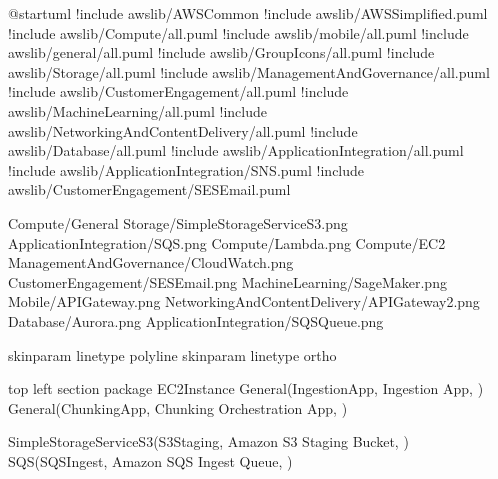\documentclass[letterpaper,10pt,english]{sphinxmanual}
\begin{document}
\begin{sphinxVerbatim}[commandchars=\\\{\},numbers=left,firstnumber=1,stepnumber=1]
@startuml
!include \PYGZlt{}awslib/AWSCommon\PYGZgt{}
!include \PYGZlt{}awslib/AWSSimplified.puml\PYGZgt{}
!include \PYGZlt{}awslib/Compute/all.puml\PYGZgt{}
!include \PYGZlt{}awslib/mobile/all.puml\PYGZgt{}
!include \PYGZlt{}awslib/general/all.puml\PYGZgt{}
!include \PYGZlt{}awslib/GroupIcons/all.puml\PYGZgt{}
!include \PYGZlt{}awslib/Storage/all.puml\PYGZgt{}
!include \PYGZlt{}awslib/ManagementAndGovernance/all.puml\PYGZgt{}
!include \PYGZlt{}awslib/CustomerEngagement/all.puml\PYGZgt{}
!include \PYGZlt{}awslib/MachineLearning/all.puml\PYGZgt{}
!include \PYGZlt{}awslib/NetworkingAndContentDelivery/all.puml\PYGZgt{}
!include \PYGZlt{}awslib/Database/all.puml\PYGZgt{}
!include \PYGZlt{}awslib/ApplicationIntegration/all.puml\PYGZgt{}
!include \PYGZlt{}awslib/ApplicationIntegration/SNS.puml\PYGZgt{}
!include \PYGZlt{}awslib/CustomerEngagement/SESEmail.puml\PYGZgt{}



\PYGZsq{}Compute/General
\PYGZsq{}Storage/SimpleStorageServiceS3.png
\PYGZsq{}ApplicationIntegration/SQS.png
\PYGZsq{}Compute/Lambda.png
\PYGZsq{}Compute/EC2
\PYGZsq{}ManagementAndGovernance/CloudWatch.png
\PYGZsq{}CustomerEngagement/SESEmail.png
\PYGZsq{}MachineLearning/SageMaker.png
\PYGZsq{}\PYGZsq{}Mobile/APIGateway.png
\PYGZsq{}NetworkingAndContentDelivery/APIGateway2.png
\PYGZsq{}Database/Aurora.png
\PYGZsq{}ApplicationIntegration/SQSQueue.png


skinparam linetype polyline
\PYGZsq{} skinparam linetype ortho

\PYGZsq{}top left section 
\PYGZsq{}\PYGZhy{}\PYGZhy{}\PYGZhy{}\PYGZhy{}\PYGZhy{}\PYGZhy{}\PYGZhy{}\PYGZhy{}\PYGZhy{}\PYGZhy{}\PYGZhy{}\PYGZhy{}\PYGZhy{}\PYGZhy{}\PYGZhy{}\PYGZhy{}\PYGZhy{}\PYGZhy{}\PYGZhy{}\PYGZhy{}\PYGZhy{}\PYGZhy{}\PYGZhy{}\PYGZhy{}\PYGZhy{}\PYGZhy{}\PYGZhy{}\PYGZhy{}\PYGZhy{}\PYGZhy{}\PYGZhy{}\PYGZhy{}\PYGZhy{}\PYGZhy{}\PYGZhy{}\PYGZhy{}\PYGZhy{}\PYGZhy{}\PYGZhy{}\PYGZhy{}\PYGZhy{}\PYGZhy{}\PYGZhy{}\PYGZhy{}\PYGZhy{}\PYGZhy{}\PYGZhy{}\PYGZhy{}\PYGZhy{}\PYGZhy{}\PYGZhy{}\PYGZhy{}\PYGZhy{}\PYGZhy{}\PYGZhy{}\PYGZhy{}\PYGZhy{}\PYGZhy{}\PYGZhy{}\PYGZhy{}\PYGZhy{}
package EC2\PYGZus{}Instance \PYGZob{}
General(IngestionApp, \PYGZdq{}Ingestion App\PYGZdq{}, \PYGZdq{} \PYGZdq{})
General(ChunkingApp, \PYGZdq{}Chunking Orchestration App\PYGZdq{}, \PYGZdq{} \PYGZdq{})
\PYGZcb{}

SimpleStorageServiceS3(S3Staging, \PYGZdq{}Amazon S3 Staging Bucket\PYGZdq{}, \PYGZdq{} \PYGZdq{})
SQS(SQSIngest, \PYGZdq{}Amazon SQS Ingest Queue\PYGZdq{}, \PYGZdq{} \PYGZdq{})


\end{sphinxVerbatim}
\end{document}
